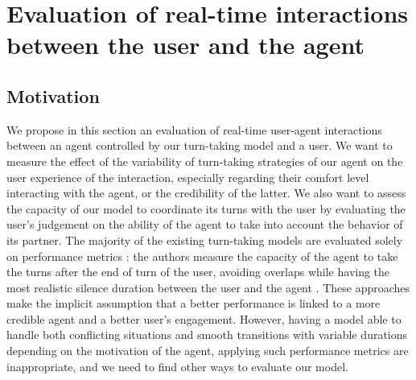 \section{Evaluation of real-time interactions between the user and the agent}
\label{sec:eval}

\subsection{Motivation}

We propose in this section an evaluation of real-time user-agent interactions between an agent controlled by our turn-taking model and a user. We want to measure the effect of the variability of turn-taking strategies of our agent on the user experience of the interaction, especially regarding their comfort level interacting with the agent, or the credibility of the latter. We also want to assess the capacity of our model to coordinate its turns with the user by evaluating the user's judgement on the ability of the agent to take into account the behavior of its partner. The majority of the existing turn-taking models are evaluated solely on performance metrics : the authors measure the capacity of the agent to take the turns after the end of turn of the user, avoiding overlaps while having the most realistic silence duration between the user and the agent \cite{jonsdottir_distributed_2013}. These approaches make the implicit assumption that a better performance is linked to a more credible agent and a better user's engagement. However, having a model able to handle both conflicting situations and smooth transitions with variable durations depending on the motivation of the agent, applying such performance metrics are inappropriate, and we need to find other ways to evaluate our model. 


